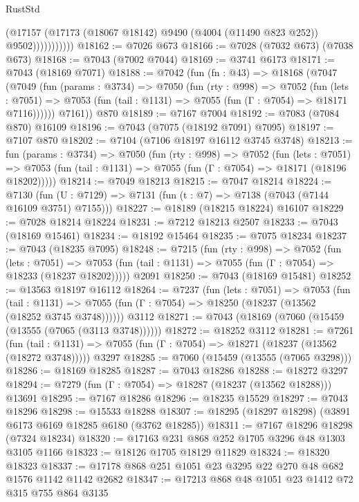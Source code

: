 \begin{lexlean}{RustStd}
\begin{coremodule}
                      (@17157
                        (@17173 (@18067 @18142) @9490 (@4004 (@11490 @823 @252)) @9502)))))))))))
@18162 := @7026 @673
@18166 := @7028 (@7032 @673) (@7038 @673)
@18168 := @7043 (@7002 @7044)
@18169 := @3741 @6173
@18171 := @7043 (@18169 @7071)
@18188 := @7042
    (fun (fn : @43) =>
    @18168
      (@7047
        (@7049
          (fun (params : @3734) =>
          @7050
            (fun (rty : @998) =>
            @7052
              (fun (lets : @7051) =>
              @7053 (fun (tail : @1131) => @7055 (fun (Γ : @7054) => @18171 @7116))))))
        @7161))
    @870
@18189 := @7167 @7004
@18192 := @7083 (@7084 @870) @16109
@18196 := @7043 (@7075 (@18192 @7091) @7095)
@18197 := @7107 @870
@18202 := @7104 (@7106 @18197 @16112 @3745 @3748)
@18213 := fun (params : @3734) =>
  @7050
    (fun (rty : @998) =>
    @7052
      (fun (lets : @7051) =>
      @7053 (fun (tail : @1131) => @7055 (fun (Γ : @7054) => @18171 (@18196 @18202)))))
@18214 := @7049 @18213
@18215 := @7047 @18214
@18224 := @7130
    (fun (U : @7129) => @7131 (fun (t : @7) => @7138 (@7043 (@7144 @16109 @3751) @7155)))
@18227 := @18189 (@18215 @18224) @16107
@18229 := @7028 @18214 @18224
@18231 := @7212 @18213 @2507
@18233 := @7043 (@18169 @15461)
@18234 := @18192 @15464
@18235 := @7075 @18234
@18237 := @7043 (@18235 @7095)
@18248 := @7215
    (fun (rty : @998) =>
    @7052
      (fun (lets : @7051) =>
      @7053 (fun (tail : @1131) => @7055 (fun (Γ : @7054) => @18233 (@18237 @18202)))))
    @2091
@18250 := @7043 (@18169 @15481)
@18252 := @13563 @18197 @16112
@18264 := @7237
    (fun (lets : @7051) =>
    @7053
      (fun (tail : @1131) =>
      @7055 (fun (Γ : @7054) => @18250 (@18237 (@13562 (@18252 @3745 @3748))))))
    @3112
@18271 := @7043 (@18169 (@7060 (@15459 (@13555 (@7065 (@3113 @3748))))))
@18272 := @18252 @3112
@18281 := @7261
    (fun (tail : @1131) => @7055 (fun (Γ : @7054) => @18271 (@18237 (@13562 (@18272 @3748)))))
    @3297
@18285 := @7060 (@15459 (@13555 (@7065 @3298)))
@18286 := @18169 @18285
@18287 := @7043 @18286
@18288 := @18272 @3297
@18294 := @7279 (fun (Γ : @7054) => @18287 (@18237 (@13562 @18288))) @13691
@18295 := @7167 @18286
@18296 := @18235 @15529
@18297 := @7043 @18296
@18298 := @15533 @18288
@18307 := @18295 (@18297 @18298) (@3891 @6173 @6169 @18285 @6180 (@3762 @18285))
@18311 := @7167 @18296 @18298 (@7324 @18234)
@18320 := @17163 @231 @868 @252 @1705 @3296 @48 @1303 @3105 @1166
@18323 := @18126 @1705 @18129 @11829
@18324 := @18320 @18323
@18337 := @17178 @868 @251 @1051 @23 @3295 @22 @270 @48 @682 @1576 @1142 @1142 @2682
@18347 := @17213 @868 @48 @1051 @23 @1412 @72 @315 @755 @864 @3135

\end{coremodule}
\end{lexlean}

